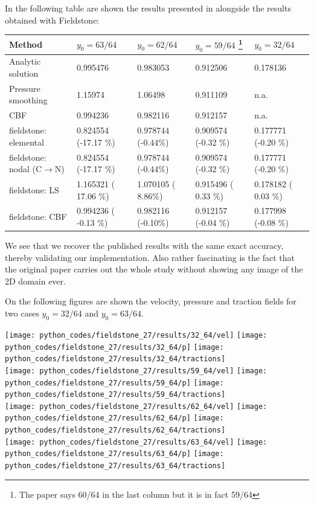 In the following table are shown the results presented in \cite{zhgh93} alongside the results obtained with Fieldstone:
\begin{center}
\begin{tabular}{l||llll}
\hline
Method             & $y_0=63/64$ & $y_0=62/64$ &  $y_0=59/64$
\footnote{The paper says 60/64 in the last column but it is in fact 59/64}
 & $y_0=32/64$\\ 
\hline
\hline
Analytic solution                   & 0.995476 & 0.983053  &  0.912506 & 0.178136 \\
Pressure smoothing \cite{zhgh93}    & 1.15974  & 1.06498   &  0.911109 & n.a. \\
CBF                \cite{zhgh93}    & 0.994236 & 0.982116  &  0.912157 & n.a. \\
\hline
\hline
fieldstone: elemental               & 0.824554 (-17.17 \%) & 0.978744 (-0.44\%) & 0.909574 (-0.32 \%) & 0.177771 (-0.20 \%)\\
fieldstone: nodal (C$\rightarrow$N) & 0.824554 (-17.17 \%) & 0.978744 (-0.44\%) & 0.909574 (-0.32 \%) & 0.177771 (-0.20 \%)\\
fieldstone: LS                      & 1.165321 ( 17.06 \%) & 1.070105 ( 8.86\%) & 0.915496 ( 0.33 \%) & 0.178182 ( 0.03 \%)\\
fieldstone: CBF                     & 0.994236 ( -0.13 \%) & 0.982116 (-0.10\%) & 0.912157 (-0.04 \%) & 0.177998 (-0.08 \%)\\
\hline
\end{tabular}
\end{center}
We see that we recover the published results with the same exact accuracy, thereby validating our implementation. Also rather fascinating is the fact that the original paper carries out the whole study without showing any image of the 2D domain ever. 

On the following figures are shown the velocity, pressure and traction fields for two cases $y_0=32/64$ and $y_0=63/64$.
\begin{center}
\texttt{[image: python\_codes/fieldstone\_27/results/32\_64/vel]}
\texttt{[image: python\_codes/fieldstone\_27/results/32\_64/p]}
\texttt{[image: python\_codes/fieldstone\_27/results/32\_64/tractions]}\\
\texttt{[image: python\_codes/fieldstone\_27/results/59\_64/vel]}
\texttt{[image: python\_codes/fieldstone\_27/results/59\_64/p]}
\texttt{[image: python\_codes/fieldstone\_27/results/59\_64/tractions]}\\
\texttt{[image: python\_codes/fieldstone\_27/results/62\_64/vel]}
\texttt{[image: python\_codes/fieldstone\_27/results/62\_64/p]}
\texttt{[image: python\_codes/fieldstone\_27/results/62\_64/tractions]}\\
\texttt{[image: python\_codes/fieldstone\_27/results/63\_64/vel]}
\texttt{[image: python\_codes/fieldstone\_27/results/63\_64/p]}
\texttt{[image: python\_codes/fieldstone\_27/results/63\_64/tractions]}
\end{center}

